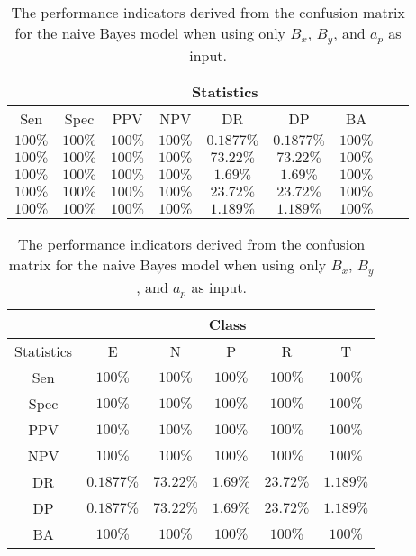 \begin{table}[!ht]
	\centering
	\begin{tabular}{|c|c|c|c|c|c|c|c|c|}
		\hline
		 & \multicolumn{7}{c|}{Statistics} \\ \hline
		Sen & Spec & PPV & NPV & DR & DP & BA \\ \hline
		$100\%$ & $100\%$ & $100\%$ & $100\%$ & $0.1877\%$ & $0.1877\%$ & $100\%$ \\ \hline
		$100\%$ & $100\%$ & $100\%$ & $100\%$ & $73.22\%$ & $73.22\%$ & $100\%$ \\ \hline
		$100\%$ & $100\%$ & $100\%$ & $100\%$ & $1.69\%$ & $1.69\%$ & $100\%$ \\ \hline
		$100\%$ & $100\%$ & $100\%$ & $100\%$ & $23.72\%$ & $23.72\%$ & $100\%$ \\ \hline
		$100\%$ & $100\%$ & $100\%$ & $100\%$ & $1.189\%$ & $1.189\%$ & $100\%$ \\ \hline
	\end{tabular}
	\caption{The performance indicators derived from the confusion matrix for the naive Bayes model when using only $B_{x}$, $B_{y}$, and $a_{p}$ as input.}
	\label{tab:cs:xyap:nb}
\end{table}

\begin{table}[!ht]
	\centering
	\begin{tabular}{|c|c|c|c|c|c|}
		\hline
		 & \multicolumn{5}{c|}{Class} \\ \hline
		Statistics & E & N & P & R & T \\ \hline
		Sen & $100\%$ & $100\%$ & $100\%$ & $100\%$ & $100\%$ \\ \hline
		Spec & $100\%$ & $100\%$ & $100\%$ & $100\%$ & $100\%$ \\ \hline
		PPV & $100\%$ & $100\%$ & $100\%$ & $100\%$ & $100\%$ \\ \hline
		NPV & $100\%$ & $100\%$ & $100\%$ & $100\%$ & $100\%$ \\ \hline
		DR & $0.1877\%$ & $73.22\%$ & $1.69\%$ & $23.72\%$ & $1.189\%$ \\ \hline
		DP & $0.1877\%$ & $73.22\%$ & $1.69\%$ & $23.72\%$ & $1.189\%$ \\ \hline
		BA & $100\%$ & $100\%$ & $100\%$ & $100\%$ & $100\%$ \\ \hline
	\end{tabular}
	\caption{The performance indicators derived from the confusion matrix for the naive Bayes model when using only $B_{x}$, $B_{y}$, and $a_{p}$ as input.}
	\label{tab:cs:reverse:xyap:nb}
\end{table}

